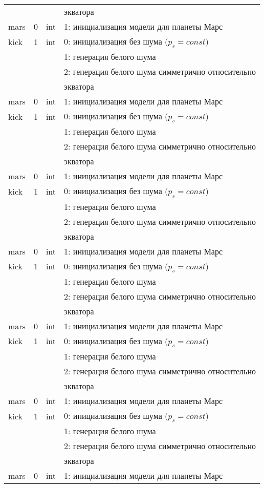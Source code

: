\begin{longtable}[c]{|l|c|l|l|}
      & & & экватора    \\
     mars & 0 & int & 1: инициализация модели для планеты Марс     \\
    kick & 1 & int & 0: инициализация без шума ($p_s = const$) \\
          &   &     & 1: генерация белого шума                  \\
          &   &     & 2: генерация белого шума симметрично относительно \\
      & & & экватора    \\
     mars & 0 & int & 1: инициализация модели для планеты Марс     \\
    kick & 1 & int & 0: инициализация без шума ($p_s = const$) \\
          &   &     & 1: генерация белого шума                  \\
          &   &     & 2: генерация белого шума симметрично относительно \\
      & & & экватора    \\
     mars & 0 & int & 1: инициализация модели для планеты Марс     \\
    kick & 1 & int & 0: инициализация без шума ($p_s = const$) \\
          &   &     & 1: генерация белого шума                  \\
          &   &     & 2: генерация белого шума симметрично относительно \\
      & & & экватора    \\
     mars & 0 & int & 1: инициализация модели для планеты Марс     \\
    kick & 1 & int & 0: инициализация без шума ($p_s = const$) \\
          &   &     & 1: генерация белого шума                  \\
          &   &     & 2: генерация белого шума симметрично относительно \\
      & & & экватора    \\
     mars & 0 & int & 1: инициализация модели для планеты Марс     \\
    kick & 1 & int & 0: инициализация без шума ($p_s = const$) \\
          &   &     & 1: генерация белого шума                  \\
          &   &     & 2: генерация белого шума симметрично относительно \\
      & & & экватора    \\
     mars & 0 & int & 1: инициализация модели для планеты Марс     \\
    kick & 1 & int & 0: инициализация без шума ($p_s = const$) \\
          &   &     & 1: генерация белого шума                  \\
          &   &     & 2: генерация белого шума симметрично относительно \\
      & & & экватора    \\
     mars & 0 & int & 1: инициализация модели для планеты Марс     \\ 
     \hline 
    \end{longtable}
\normalsize%
